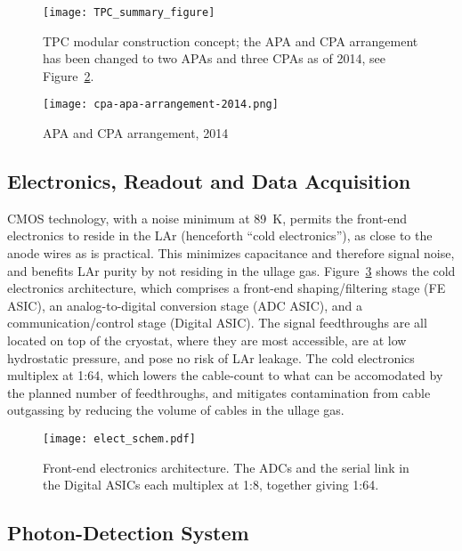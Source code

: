 \begin{figure}[htbp]
\centering
\texttt{[image: TPC\_summary\_figure]}
\caption{TPC modular construction concept; the APA and CPA arrangement has been changed to two APAs and three CPAs as of 2014, see Figure~\ref{fig:cpa-apa-arrangement-2014}.}
\label{fig:tpc-concept}
\end{figure}

\begin{figure}[htbp]
\centering
\texttt{[image: cpa-apa-arrangement-2014.png]}
\caption{APA and CPA arrangement, 2014}
\label{fig:cpa-apa-arrangement-2014}
\end{figure}


\subsection{Electronics, Readout and Data Acquisition}
\label{sec:det_electronics}

CMOS technology, with a noise minimum at 89~K,
permits the front-end electronics to reside in the LAr (henceforth ``cold electronics''),
as close to the anode wires as is practical.
This minimizes capacitance and therefore signal noise,
and benefits LAr purity by not residing in the ullage gas.
Figure~\ref{fig:elect_schem} shows the cold electronics architecture,
which comprises a front-end shaping/filtering stage (FE ASIC),
an analog-to-digital conversion stage (ADC ASIC), and a communication/control stage (Digital ASIC).
The signal feedthroughs are all located on top of the cryostat, where they are most accessible,
are at low hydrostatic pressure, and pose no risk of LAr leakage.
The cold electronics multiplex at 1:64,
which lowers the cable-count to what can be accomodated by the planned number of feedthroughs,
and mitigates contamination from cable outgassing
by reducing the volume of cables in the ullage gas.

\begin{figure}[htbp]
\centering
\texttt{[image: elect\_schem.pdf]}
\caption{Front-end electronics architecture.
         The ADCs and the serial link in the Digital ASICs each multiplex at 1:8, together giving 1:64.
        }
\label{fig:elect_schem}
\end{figure}




\subsection{Photon-Detection System}

